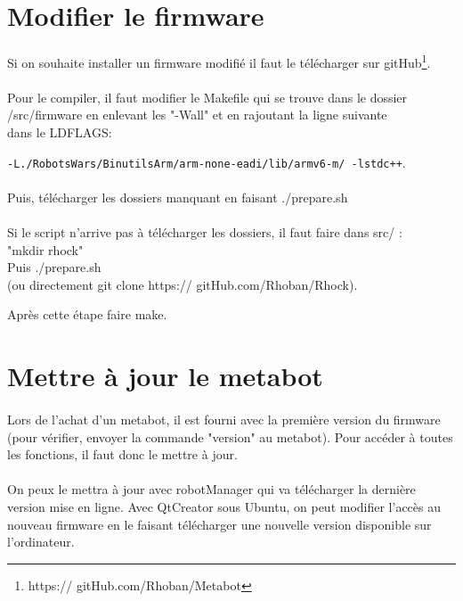 \documentclass[10pt,a4paper]{report}
\begin{document}
\section{Modifier le firmware}
\paragraph{}

Si on souhaite installer un firmware modifié il faut le télécharger sur  gitHub\footnote{https:// gitHub.com/Rhoban/Metabot}.
\paragraph{}
Pour le compiler, il faut modifier le Makefile qui se trouve dans le dossier\\ /src/firmware en enlevant les "-Wall" et en rajoutant la ligne suivante \\dans le LDFLAGS:

\texttt{-L./RobotsWars/BinutilsArm/arm-none-eadi/lib/armv6-m/ -lstdc++}.


\paragraph{}
Puis, télécharger les dossiers manquant en faisant ./prepare.sh
\paragraph{}
Si le script n'arrive pas à télécharger les dossiers, il faut faire dans src/ :\\
"mkdir rhock"  \\
Puis ./prepare.sh \\
(ou directement git clone https:// gitHub.com/Rhoban/Rhock).

Après cette étape faire make.

\section{Mettre à jour le metabot}
\paragraph{}
Lors de l'achat d'un metabot, il est fourni avec la première version du firmware (pour vérifier, envoyer la commande "version" au metabot). Pour accéder à toutes les fonctions, il faut donc le mettre à jour.
\paragraph{}
On peux le mettra à jour avec robotManager qui va télécharger la dernière version mise en ligne.
Avec QtCreator sous Ubuntu, on peut modifier l'accès au nouveau firmware en le faisant télécharger une nouvelle version disponible sur l'ordinateur.
\end{document}
